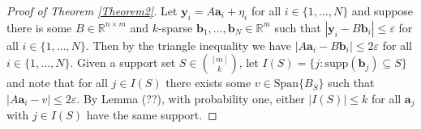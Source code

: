 \documentclass[journal, onecolumn]{IEEEtran}
\begin{document}
\begin{proof}[Proof of Theorem \ref{Theorem2}]
Let $\mathbf{y}_i = A\mathbf{a}_i + \eta_i$ for all $i \in \{1, \ldots, N\}$ and suppose there is some $B \in \mathbb{R}^{n \times m}$ and $k$-sparse $\mathbf{b}_1, \ldots, \mathbf{b}_N \in \mathbb{R}^m$ such that $|\mathbf{y}_i - B\mathbf{b}_i| \leq \varepsilon$ for all $i \in \{1, \ldots, N\}$. Then by the triangle inequality we have $|A\mathbf{a}_i - B\mathbf{b}_i| \leq 2\varepsilon$ for all $i \in \{1, \ldots, N\}$. Given a support set $S \in {[m]\choose k}$, let $I(S) = \{j: \text{supp}(\mathbf{b}_j) \subseteq S\}$ and note that for all $j \in I(S)$ there exists some $v \in \text{Span}\{B_S\}$ such that $|A\mathbf{a}_i - v| \leq 2\varepsilon$. By Lemma (??), with probability one, either $|I(S)| \leq k$ for all $\mathbf{a}_j$ with $j \in I(S)$ have the same support.
\end{proof}
\end{document}
